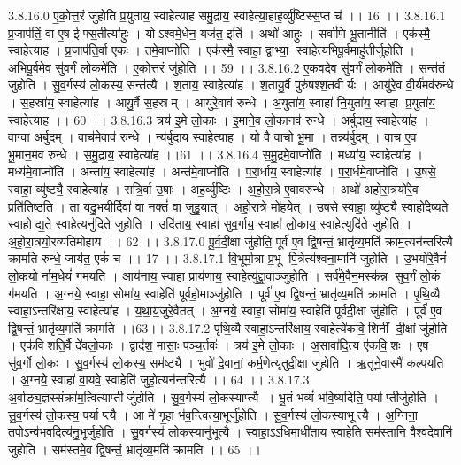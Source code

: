 3.8.16.0
ए॒को॒त्त॒रं जु॑होति प्र॒युता॑य॒ स्वाहेत्या॑ह समु॒द्राय॒ स्वाहेत्या॒हाह॒र्व्यु॑ष्टिस्स॒प्त च॑ ।। 16 ।।
3.8.16.1
प्र॒जाप॑तिं॒ वा ए॒ष ईफ्स॒तीत्या॑हुः । योऽश्वमे॒धेन॒ यज॑त॒ इति॑ । अथो॑ आहुः । सर्वा॑णि भू॒तानीति॑ । एक॑स्मै॒ स्वाहेत्या॑ह । प्र॒जाप॑ति॒र्वा एकः॑ । तमे॒वाप्नो॑ति । एक॑स्मै॒ स्वाहा॒ द्वाभ्या॒॒ स्वाहेत्य॑भिपू॒र्वमाहु॑तीर्जुहोति । अ॒भि॒पू॒र्वमे॒व सु॑व॒र्गं लो॒कमे॑ति । ए॒को॒त्त॒रं जु॑होति ।। 59 ।।
3.8.16.2
ए॒क॒वदे॒व सु॑व॒र्गं लो॒कमे॑ति । सन्त॑तं जुहोति । सु॒व॒र्गस्य॑ लो॒कस्य॒ सन्त॑त्यै । श॒ताय॒ स्वाहेत्या॑ह । श॒तायु॒र्वै पुरु॑षश्श॒तवीर्यः । आयु॑रे॒व वी॒र्य॑मव॑रुन्धे । स॒हस्रा॑य॒ स्वाहेत्या॑ह । आयु॒र्वै स॒हस्रम् । आयु॑रे॒वाव॑ रुन्धे । अ॒युता॑य॒ स्वाहा॑ नि॒युता॑य॒ स्वाहा प्र॒युता॑य॒ स्वाहेत्या॑ह ।। 60 ।।
3.8.16.3
त्रय॑ इ॒मे लो॒काः । इ॒माने॒व लो॒कानव॑ रुन्धे । अर्बु॑दाय॒ स्वाहेत्या॑ह । वाग्वा अर्बु॑दम् । वाच॑मे॒वाव॑ रुन्धे । न्य॑र्बुदाय॒ स्वाहेत्या॑ह । यो वै वा॒चो भू॒मा । तन्न्य॑र्बुदम् । वा॒च ए॒व भू॒मान॒मव॑ रुन्धे । स॒मु॒द्राय॒ स्वाहेत्या॑ह ।।61 ।।
3.8.16.4
स॒मु॒द्रमे॒वाप्नो॑ति । मध्या॑य॒ स्वाहेत्या॑ह । मध्य॑मे॒वाप्नो॑ति । अन्ता॑य॒ स्वाहेत्या॑ह । अन्त॑मे॒वाप्नो॑ति । प॒रा॒र्धाय॒ स्वाहेत्या॑ह । प॒रा॒र्धमे॒वाप्नो॑ति । उ॒षसे॒ स्वाहा॒ व्यु॑ष्ट्यै॒ स्वाहेत्या॑ह । रात्रि॒र्वा उ॒षाः । अह॒र्व्यु॑ष्टिः । अ॒हो॒रा॒त्रे ए॒वाव॑रुन्धे । अथो॑ अहोरा॒त्रयो॑रे॒व प्रति॑तिष्ठति । ता यदु॒भयी॒र्दिवा॑ वा॒ नक्तं॑ वा जुहु॒यात् । अ॒हो॒रा॒त्रे मो॑हयेत् । उ॒षसे॒ स्वाहा॒ व्यु॑ष्ट्यै॒ स्वाहो॑देष्य॒ते स्वाहोद्य॒ते स्वाहेत्यनु॑दिते जुहोति । उदि॑ताय॒ स्वाहा॑ सुव॒र्गाय॒ स्वाहा॑ लो॒काय॒ स्वाहेत्युदि॑ते जुहोति । अ॒हो॒रा॒त्रयो॒रव्य॑तिमोहाय ।। 62 ।।
3.8.17.0
पू॒र्व॒दी॒क्षा जु॑होति॒ पूर्व॑ ए॒व द्वि॒षन्तं॒ भ्रातृ॑व्य॒मति॑ क्राम॒त्यन॑न्तरित्यै क्रामति रुन्धे॒ जाय॑त॒ एकं॑ च ।। 17 ।।
3.8.17.1
वि॒भूर्मा॒त्रा प्र॒भू पि॒त्रेत्य॑श्वना॒मानि॑ जुहोति । उ॒भयो॑रे॒वैनं॑ लो॒कयोर्नाम॒धेयं॑ गमयति । आय॑नाय॒ स्वाहा॒ प्राय॑णाय॒ स्वाहेत्यु॑द्द्रा॒वाञ्जु॑होति । सर्व॑मे॒वैन॒मस्क॑न्न सुव॒र्गं लो॒कं ग॑मयति । अ॒ग्नये॒ स्वाहा॒ सोमा॑य॒ स्वाहेति॑ पूर्वहो॒माञ्जु॑होति । पूर्व॑ ए॒व द्वि॒षन्तं॒ भ्रातृ॑व्य॒मति॑ क्रामति । पृ॒थि॒व्यै स्वाहा॒ऽन्तरि॑क्षाय॒ स्वाहेत्या॑ह । य॒था॒य॒जुरे॒वैतत् । अ॒ग्नये॒ स्वाहा॒ सोमा॑य॒ स्वाहेति॑ पूर्वदी॒क्षा जु॑होति । पूर्व॑ ए॒व द्वि॒षन्तं॒ भ्रातृ॑व्य॒मति॑ क्रामति ।।63।।
3.8.17.2
पृ॒थि॒व्यै स्वाहा॒ऽन्तरि॑क्षाय॒ स्वाहेत्ये॑कवि॒॒शिनीं दी॒क्षां जु॑होति । एक॑विशति॒र्वै दे॑वलो॒काः । द्वाद॑श॒ मासाः॒ पञ्च॒र्तवः॑ । त्रय॑ इ॒मे लो॒काः । अ॒सावा॑दि॒त्य ए॑कवि॒॒शः । ए॒ष सु॑व॒र्गो लो॒कः । सु॒व॒र्गस्य॑ लो॒कस्य॒ सम॑ष्ट्यै । भुवो॑ दे॒वानां॒ कर्म॒णेत्यृ॑तुदी॒क्षा जु॑होति । ऋ॒तूने॒वास्मै॑ कल्पयति । अ॒ग्नये॒ स्वाहा॑ वा॒यवे॒ स्वाहेति॑ जुहो॒त्यन॑न्तरित्यै ।। 64 ।।
3.8.17.3
अ॒र्वाङ्य॒ज्ञस्संक्रा॑म॒त्वित्याप्तीर्जुहोति । सु॒व॒र्गस्य॑ लो॒कस्याप्त्यै । भू॒तं भव्यं॑ भवि॒ष्यदिति॒ पर्याप्तीर्जुहोति । सु॒व॒र्गस्य॑ लो॒कस्य॒ पर्याप्त्यै । आ मे॑ गृ॒हा भ॑व॒न्त्वित्या॒भूर्जु॑होति । सु॒व॒र्गस्य॑ लो॒कस्याभूत्यै । अ॒ग्निना॒ तपोऽन्व॑भव॒दित्य॑नु॒भूर्जु॑होति । सु॒व॒र्गस्य॑ लो॒कस्यानु॑भूत्यै । स्वाहा॒ऽऽधिमाधी॑ताय॒ स्वाहेति॒ सम॑स्तानि वैश्वदे॒वानि॑ जुहोति । सम॑स्तमे॒व द्वि॒षन्तं॒ भ्रातृ॑व्य॒मति॑ क्रामति ।। 65 ।।
